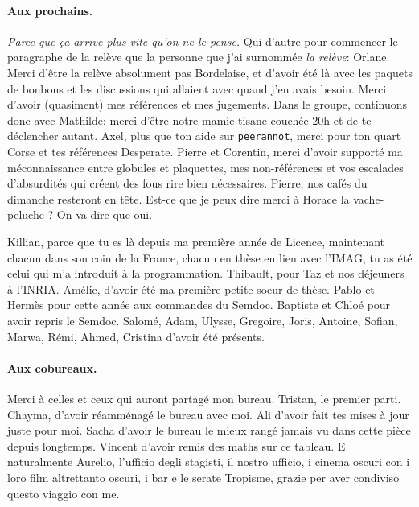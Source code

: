 \medskip
\paragraph*{Aux prochains.}
\emph{Parce que ça arrive plus vite qu'on ne le pense.}
Qui d'autre pour commencer le paragraphe de la relève que la personne que j'ai surnommée \emph{la relève}: Orlane. Merci d'être la relève absolument pas Bordelaise, et d'avoir été là avec les paquets de bonbons et les discussions qui allaient avec quand j'en avais besoin. Merci d'avoir (quasiment) mes références et mes jugements.
Dans le groupe, continuons donc avec Mathilde: merci d'être notre mamie tisane-couchée-20h et de te déclencher autant.
Axel, plus que ton aide sur \texttt{peerannot}, merci pour ton quart Corse et tes références Desperate.
Pierre et Corentin, merci d'avoir supporté ma méconnaissance entre globules et plaquettes, mes non-références et vos escalades d'absurdités qui créent des fous rire bien nécessaires.
Pierre, nos cafés du dimanche resteront en tête.
Est-ce que je peux dire merci à Horace la vache-peluche ? On va dire que oui.

Killian, parce que tu es là depuis ma première année de Licence, maintenant chacun dans son coin de la France, chacun en thèse en lien avec l'IMAG, tu as été celui qui m'a introduit à la programmation.
Thibault, pour Taz et nos déjeuners à l'INRIA.
Amélie, d'avoir été ma première petite soeur de thèse.
Pablo et Hermès pour cette année aux commandes du Semdoc.
Baptiste et Chloé pour avoir repris le Semdoc.
Salomé, Adam, Ulysse, Gregoire, Joris, Antoine, Sofian, Marwa, Rémi, Ahmed, Cristina d'avoir été présents.

\medskip

\paragraph*{Aux cobureaux.}
Merci à celles et ceux qui auront partagé mon bureau.
Tristan, le premier parti.
Chayma, d'avoir réamménagé le bureau avec moi.
Ali d'avoir fait tes mises à jour juste pour moi.
Sacha d'avoir le bureau le mieux rangé jamais vu dans cette pièce depuis longtemps.
Vincent d'avoir remis des maths sur ce tableau.
E naturalmente Aurelio, l'ufficio degli stagisti, il nostro ufficio, i cinema oscuri con i loro film altrettanto oscuri, i bar e le serate Tropisme, grazie per aver condiviso questo viaggio con me.

\medskip

